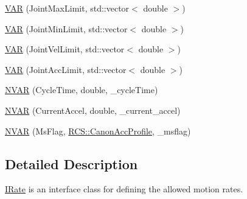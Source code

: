 \begin{DoxyCompactItemize}
\item 
\hyperlink{classRCS_1_1IRate_ae637d8d93769168434d67bc6971df343}{V\-A\-R} (Joint\-Max\-Limit, std\-::vector$<$ double $>$)
\item 
\hyperlink{classRCS_1_1IRate_a702e8b9a2d3d6f1c60240d6179e8ed17}{V\-A\-R} (Joint\-Min\-Limit, std\-::vector$<$ double $>$)
\item 
\hyperlink{classRCS_1_1IRate_ab62d7d8cab1b4cc52f8b5fe9f552f661}{V\-A\-R} (Joint\-Vel\-Limit, std\-::vector$<$ double $>$)
\item 
\hyperlink{classRCS_1_1IRate_af5dbd66ac13def8ab6c5211715d6f480}{V\-A\-R} (Joint\-Acc\-Limit, std\-::vector$<$ double $>$)
\item 
\hyperlink{classRCS_1_1IRate_ac76bd2dad2dbbb7d5eb3c9fc62268e7d}{N\-V\-A\-R} (Cycle\-Time, double, \-\_\-cycle\-Time)
\item 
\hyperlink{classRCS_1_1IRate_ab3a49ecf0a0d182984250c176740b226}{N\-V\-A\-R} (Current\-Accel, double, \-\_\-current\-\_\-accel)
\item 
\hyperlink{classRCS_1_1IRate_af4a469eded68e987ceacff571288d488}{N\-V\-A\-R} (Ms\-Flag, \hyperlink{namespaceRCS_a452a9217023e577031dcdf7e533b2ead}{R\-C\-S\-::\-Canon\-Acc\-Profile}, \-\_\-msflag)
\end{DoxyCompactItemize}


\subsection{Detailed Description}
\hyperlink{classRCS_1_1IRate}{I\-Rate} is an interface class for defining the allowed motion rates. 

